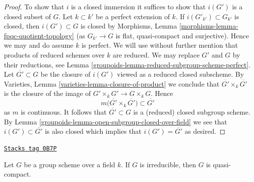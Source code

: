 \begin{proof}

To show that $i$ is a closed immersion it suffices to show that
$i(G')$ is a closed subset of $G$. Let $k \subset k'$ be a perfect
extension of $k$. If $i(G'_{k'}) \subset G_{k'}$ is closed, then
$i(G') \subset G$ is closed by
Morphisms, Lemma \ref{morphisms-lemma-fpqc-quotient-topology}
(as $G_{k'} \to G$ is flat, quasi-compact and surjective).
Hence we may and do assume $k$ is perfect. We will use without further
mention that products of reduced schemes over $k$ are reduced.
We may replace $G'$ and $G$ by their reductions, see
Lemma \ref{groupoids-lemma-reduced-subgroup-scheme-perfect}.
Let $\overline{G'} \subset G$ be the closure of $i(G')$ viewed
as a reduced closed subscheme. By
Varieties, Lemma \ref{varieties-lemma-closure-of-product}
we conclude that $\overline{G'} \times_k \overline{G'}$
is the closure of the image of $G' \times_k G' \to G \times_k G$. Hence
$$
m\Big(\overline{G'} \times_k \overline{G'}\Big)
\subset \overline{G'}
$$
as $m$ is continuous. It follows that $\overline{G'} \subset G$
is a (reduced) closed subgroup scheme. By
Lemma \ref{groupoids-lemma-open-subgroup-closed-over-field}
we see that $i(G') \subset \overline{G'}$ is also closed
which implies that $i(G') = \overline{G'}$ as desired.
\end{proof}

\begin{lemma}
\label{groupoids-lemma-irreducible-group-scheme-over-field-qc}
\href{https://stacks.math.columbia.edu/tag/0B7P}{\texttt{Stacks tag 0B7P}}

Let $G$ be a group scheme over a field $k$. If $G$ is irreducible,
then $G$ is quasi-compact.
\end{lemma}

